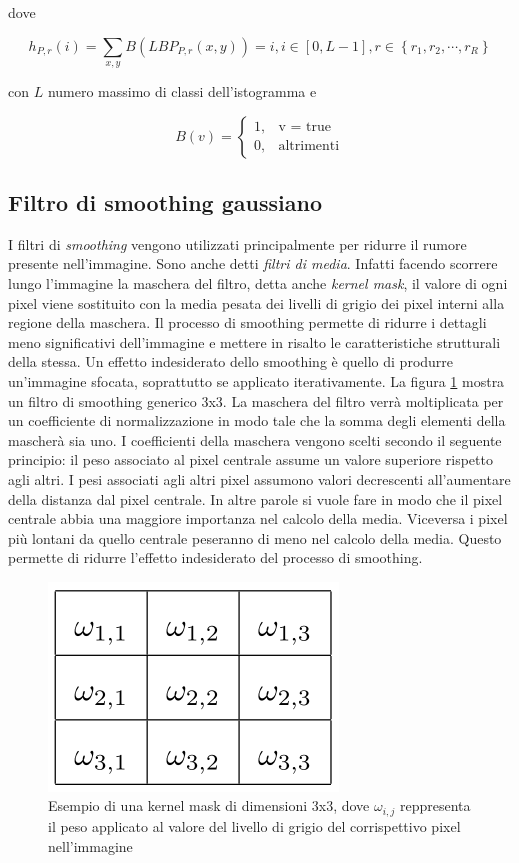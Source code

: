 \noindent dove

\begin{equation}
h_{P,r}(i) = \sum_{x, y} B(LBP_{P,r}(x, y)) = i, i \in  [0, L-1 ], r \in \left\lbrace  r_1, r_2, \cdots, r_R \right\rbrace
\end{equation}

\noindent con $L$ numero massimo di classi dell'istogramma e

\begin{equation}
B(v) = 	\begin{cases} 1, & \mbox{v = true} \\ 0, & \mbox{altrimenti} \end{cases}
\end{equation}

\subsection{Filtro di smoothing gaussiano}
I filtri di \emph{smoothing} vengono utilizzati principalmente per ridurre il rumore presente nell'immagine. Sono anche detti \emph{filtri di media}. Infatti facendo scorrere lungo l'immagine la maschera del filtro, detta anche \emph{kernel mask}, il valore di ogni pixel viene sostituito con la media pesata dei livelli di grigio dei pixel interni alla regione della maschera. Il processo di smoothing permette di ridurre i dettagli meno significativi dell'immagine e mettere in risalto le caratteristiche strutturali della stessa.
Un effetto indesiderato dello smoothing è quello di produrre un'immagine sfocata, soprattutto se applicato iterativamente.
La figura \ref{fig:kernelMask} mostra un filtro di smoothing generico 3x3. La maschera del filtro verrà moltiplicata per un coefficiente di normalizzazione in modo tale che la somma degli elementi della mascherà sia uno. I coefficienti della maschera vengono scelti secondo il seguente principio: il peso associato al pixel centrale assume un valore superiore rispetto agli altri. I pesi associati agli altri pixel assumono valori decrescenti all'aumentare della distanza dal pixel centrale. In altre parole si vuole fare in modo che il pixel centrale abbia una maggiore importanza nel calcolo della media. Viceversa i pixel più lontani da quello centrale peseranno di meno nel calcolo della media. Questo permette di ridurre l'effetto indesiderato del processo di smoothing. \\

\begin{figure}[ht]
\begin{center}
\includegraphics[width=.3\textwidth]{img/kernel_mask}
\caption{ Esempio di una kernel mask di dimensioni 3x3, dove $\omega_{i,j}$ reppresenta il peso applicato al valore del livello di grigio del corrispettivo pixel nell'immagine}
\label{fig:kernelMask}
\end{center}
\end{figure}

